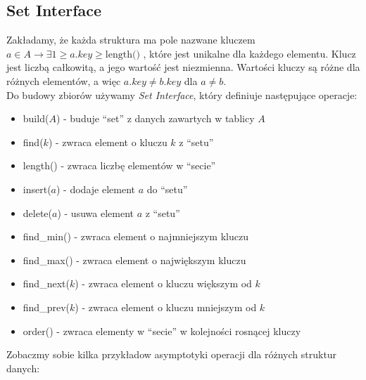 \documentclass[11pt,a4paper]{article}
\begin{document}
\subsection{Set Interface}
Zakładamy, że każda struktura ma pole nazwane kluczem $a \in A \rightarrow \exists 1 \geq a.key \geq \text{length()}$ , które jest unikalne dla każdego elementu. Klucz jest liczbą całkowitą, a jego wartość jest niezmienna. Wartości kluczy są różne dla różnych elementów, a więc $a.key \neq b.key$ dla $a \neq b$.\\
Do budowy zbiorów używamy \textit{Set Interface}, który definiuje następujące operacje:
\begin{itemize}
    \item build($A$) - buduje ``set'' z danych zawartych w tablicy $A$
    \item find($k$) - zwraca element o kluczu $k$ z ``setu''
    \item length() - zwraca liczbę elementów w ``secie''
    \item insert($a$) - dodaje element $a$ do ``setu''
    \item delete($a$) - usuwa element $a$ z ``setu''
    \item find\_min() - zwraca element o najmniejszym kluczu
    \item find\_max() - zwraca element o największym kluczu
    \item find\_next($k$) - zwraca element o kluczu większym od $k$
    \item find\_prev($k$) - zwraca element o kluczu mniejszym od $k$
    \item order() - zwraca elementy w ``secie'' w kolejności rosnącej kluczy
\end{itemize}
Zobaczmy sobie kilka przykładow asymptotyki operacji dla różnych struktur danych:
\end{document}
